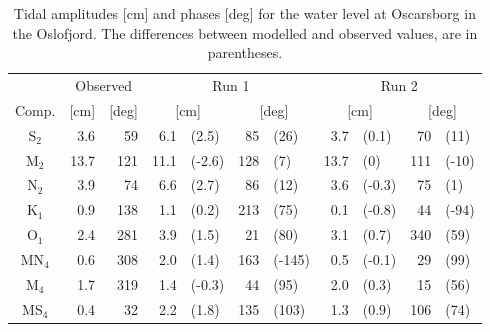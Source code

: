 \begin{table}[ht]
\caption{Tidal amplitudes [cm] and phases [deg] for the water level at Oscarsborg in the Oslofjord. The differences between modelled and observed values, are in parentheses.}
\label{tab:Oscarsborg}
\centering
\begin{tabular}{crrr@{ }lr@{ }lr@{ }lr@{ }l} \hline
      & \multicolumn{2}{c}{Observed} & \multicolumn{4}{c}{Run 1} & \multicolumn{4}{c}{Run 2}  \\
Comp. &  [cm] & [deg] & \multicolumn{2}{c}{[cm]} & \multicolumn{2}{c}{[deg]} & \multicolumn{2}{c}{[cm]} & \multicolumn{2}{c}{[deg]} \\ \hline 
S$_2$  &   3.6 &  59  &   6.1 & (2.5)  &  85 & (26)   &  3.7 & (0.1)  &  70 & (11)  \\
M$_2$  &  13.7 & 121  &  11.1 & (-2.6) & 128 & (7)    & 13.7 & (0)    & 111 & (-10) \\
N$_2$  &   3.9 &  74  &   6.6 & (2.7)  &  86 & (12)   &  3.6 & (-0.3) &  75 & (1)   \\
K$_1$  &   0.9 & 138  &   1.1 & (0.2)  & 213 & (75)   &  0.1 & (-0.8) &  44 & (-94) \\
O$_1$  &   2.4 & 281  &   3.9 & (1.5)  &  21 & (80)   &  3.1 & (0.7)  & 340 & (59)  \\
MN$_4$ &   0.6 & 308  &   2.0 & (1.4)  & 163 & (-145) &  0.5 & (-0.1) &  29 & (99)  \\
M$_4$  &   1.7 & 319  &   1.4 & (-0.3) &  44 & (95)   &  2.0 & (0.3)  &  15 & (56)  \\
MS$_4$ &   0.4 &  32  &   2.2 & (1.8)  & 135 & (103)  &  1.3 & (0.9)  & 106 & (74)  \\ \hline 
\end{tabular}
\end{table}


